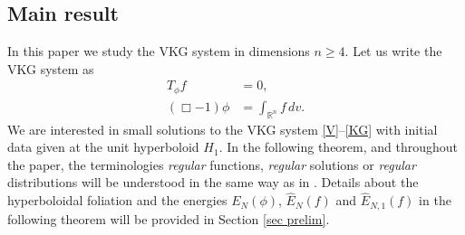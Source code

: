 \documentclass{article}
\newcommand{\bbr}{{\mathbb R}}
\newcommand{\bbrn}{{\bbr^n}}
\begin{document}
%
\subsection{Main result} \label{sec main}
In this paper we study the VKG system in dimensions $ n \geq 4 $. Let us write the VKG system as
\begin{align}
T_\phi f & = 0 , \label{V} \\
( \Box - 1 ) \phi & = \int_\bbrn f \, d v . \label{KG}
\end{align}
We are interested in small solutions to the VKG system \eqref{V}--\eqref{KG} with initial data given at the unit hyperboloid $ H_1 $. In the following theorem, and throughout the paper, the terminologies {\it regular} functions, {\it regular} solutions or {\it regular} distributions will be understood in the same way as in \cite{FJS17}. Details about the hyperboloidal foliation and the energies $ E_N ( \phi ) $, $ \hat{ E }_N ( f ) $ and $ \hat{ E }_{ N , 1 } ( f ) $ in the following theorem will be provided in Section \ref{sec prelim}.
\end{document}
